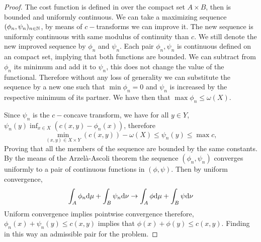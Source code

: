 \begin{proof}
The cost function is defined in over the compact set $A\times B$, then is bounded and uniformly continuous. We can take a maximizing sequence $(\phi_n, \psi_n)_{n\in \mathbb{N}}$, by means of $c-$transforms we can improve it. The new sequence is uniformly continuous with same modulus of continuity than $c$.  We still denote the new improved sequence by $\phi_n$ and $\psi_n$. Each pair $\phi_n, \psi_n$ is continuous defined on an compact set, implying that both functions are bounded. We can subtract from $\phi_n$ its minimum and add it to $\psi_n$, this does not change the value of the functional. Therefore without any loss of generality we can substitute the sequence by a new one such that $\min \phi_n =0$ and $\psi_n$ is increased by the respective minimum of its partner. We have then that $\max \phi_n \leq \omega(X)$.

Since $\psi_n$ is the $c-$concave transform, we have for all $y\in Y$, $\psi_n(y)\inf_{x\in X}(c(x,y)-\phi_n(x))$, therefore
 \begin{equation}
 	\min_{(x,y)\in X\times Y}(c(x,y))-\omega(X)\leq\psi_n(y)\leq \max c,
 \end{equation}
 Proving that all the members of the sequence are bounded by the same constants.  By the means of the Arzel\`a-Ascoli theorem the sequence $(\phi_n, \psi_n)$ converges uniformly to a pair of continuous functions in $(\phi, \psi)$. Then by uniform convergence,
 \begin{equation}
 	\int_A \phi_n\mathrm{d}\mu + \int_B \psi_n\mathrm{d}\nu\rightarrow  	\int_A \phi\mathrm{d}\mu + \int_B \psi\mathrm{d}\nu
 \end{equation} 
 Uniform convergence implies pointwise convergence therefore, $\phi_n(x)+\psi_n(y)\leq c(x,y)$ implies that $\phi(x)+\phi(y)\leq c(x,y)$. Finding in this way an admissible pair for the problem.
\end{proof}

